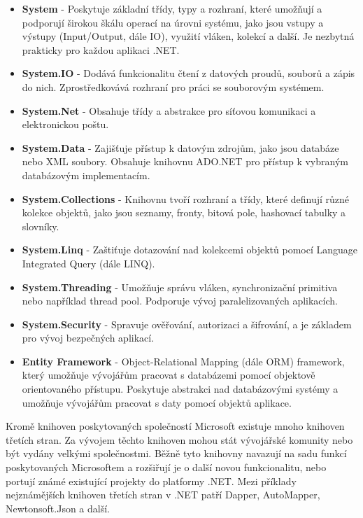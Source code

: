 \begin{itemize}
    \item \textbf{System} - Poskytuje základní třídy, typy a rozhraní, které umožňují a podporují širokou škálu operací na úrovni systému, jako jsou vstupy a výstupy (Input/Output, dále IO), využití vláken, kolekcí a další. Je nezbytná prakticky pro každou aplikaci .NET.
    \item \textbf{System.IO} - Dodává funkcionalitu čtení z datových proudů, souborů a zápis do nich. Zprostředkovává rozhraní pro práci se souborovým systémem.
    \item \textbf{System.Net} - Obsahuje třídy a abstrakce pro síťovou komunikaci a elektronickou poštu.
    \item \textbf{System.Data} - Zajišťuje přístup k datovým zdrojům, jako jsou databáze nebo XML soubory. Obsahuje knihovnu ADO.NET pro přístup k vybraným databázovým implementacím.
    \item \textbf{System.Collections} - Knihovnu tvoří rozhraní a třídy, které definují různé kolekce objektů, jako jsou seznamy, fronty, bitová pole, hashovací tabulky a slovníky.
    \item \textbf{System.Linq} - Zaštiťuje dotazování nad kolekcemi objektů pomocí Language Integrated Query (dále LINQ).
    \item \textbf{System.Threading} - Umožňuje správu vláken, synchronizační primitiva nebo například thread pool. Podporuje vývoj paralelizovaných aplikacích.
    \item \textbf{System.Security} - Spravuje ověřování, autorizaci a šifrování, a je základem pro vývoj bezpečných aplikací.
    \item \textbf{Entity Framework} - Object-Relational Mapping (dále ORM) framework, který umožňuje vývojářům pracovat s databázemi pomocí objektově orientovaného přístupu. Poskytuje abstrakci nad databázovými systémy a umožňuje vývojářům pracovat s daty pomocí objektů aplikace.
\end{itemize}

Kromě knihoven poskytovaných společností Microsoft existuje mnoho knihoven třetích stran. Za vývojem těchto knihoven mohou stát vývojářské komunity nebo být vydány velkými společnostmi. Běžně tyto knihovny navazují na sadu funkcí poskytovaných Microsoftem a rozšiřují je o další novou funkcionalitu, nebo portují známé existující projekty do platformy .NET. Mezi příklady nejznámějších knihoven třetích stran v .NET patří Dapper, AutoMapper, Newtonsoft.Json a další.


